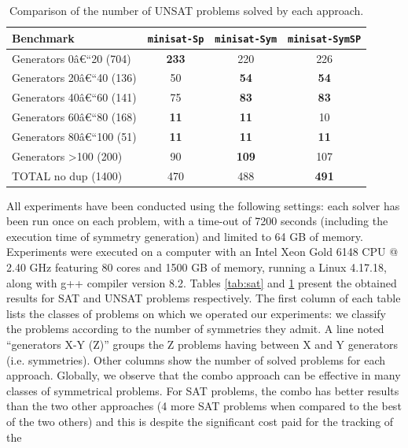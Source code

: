 \begin{table}\footnotesize
 \centering
 \begin{tabular}{l|ccc}
  \toprule
  Benchmark  &\texttt{minisat-Sp} & \texttt{minisat-Sym} & \texttt{minisat-SymSP}\\
  \hline 
  Generators 0â€“20 (704) & \cellcolor{gray!30,}\textbf{233}&220&226\\
  Generators 20â€“40 (136) & 50&\cellcolor{gray!30}\textbf{54}&\cellcolor{gray!30}\textbf{54}\\
  Generators 40â€“60 (141) & 75&\cellcolor{gray!30}\textbf{83}&\cellcolor{gray!30}\textbf{83}\\
  Generators 60â€“80 (168) & \cellcolor{gray!30}\textbf{11}&\cellcolor{gray!30}\textbf{11}&10\\
  Generators 80â€“100 (51) & \cellcolor{gray!30}\textbf{11}&\cellcolor{gray!30}\textbf{11}&\cellcolor{gray!30}\textbf{11}\\
  Generators \textgreater100 (200) & 90&\cellcolor{gray!30,}\textbf{109}&107\\
  \hline 
  TOTAL no dup (1400) & 470&488&\cellcolor{gray!30,}\textbf{491}\\
  \bottomrule
 \end{tabular}
 \caption{Comparison of the number of UNSAT problems solved by each approach.}
 \label{tab:unsat}
\end{table}
All experiments have been conducted using the following settings: each solver
has been run once on each problem, with a time-out of 7200 seconds (including
the execution time of symmetry generation) and limited to 64 GB of memory.
Experiments were executed on a computer with an Intel Xeon Gold 6148 CPU
@ 2.40 GHz featuring 80 cores and 1500 GB of memory, running a Linux 4.17.18,
along with g++ compiler version 8.2.
Tables \ref{tab:sat} and \ref{tab:unsat} present the obtained results for SAT
and UNSAT problems respectively. The first column of each table lists the
classes of problems on which we operated our experiments: we classify the
problems according to the number of symmetries they admit. A line noted
``generators X-Y (Z)'' groups the Z problems having between X and Y generators
(i.e. symmetries). Other columns show the number of solved problems for each
approach.
Globally, we observe that the combo approach can be effective in many classes
of symmetrical problems. For SAT problems, the combo has better results than the
two other approaches (4 more SAT problems when compared to the best of the two
others) and this is despite the significant cost paid for the tracking of the
